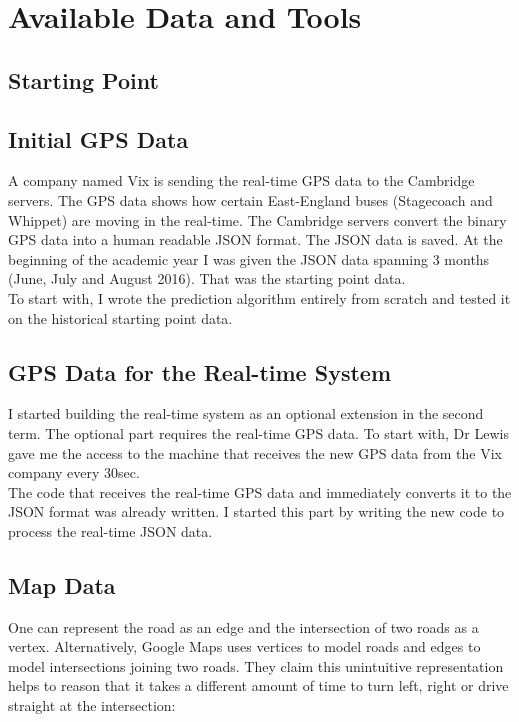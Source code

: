\documentclass[12pt,a4paper,oneside,openright]{report}
\begin{document}
\section{Available Data and Tools}

\subsection{Starting Point}

\subsection*{Initial GPS Data}
A company named Vix is sending the real-time GPS data to the Cambridge servers. The GPS
data shows how certain East-England buses (Stagecoach and Whippet) are moving 
in the real-time. The Cambridge servers convert the binary GPS data into a human readable
JSON format. The JSON data is saved. At the beginning of the academic year I was given the
JSON data spanning 3 months (June, July and August 2016).
That was the starting point data. \\

To start with, I wrote the prediction algorithm entirely from scratch and tested it on the historical
starting point data.

\subsection*{GPS Data for the Real-time System}
I started building the real-time system as an optional extension in the second term.
The optional part requires the real-time GPS data. To start with, Dr Lewis gave me
the access to the machine that receives the new GPS data from the Vix company every 30sec. \\

The code that receives the real-time GPS data and immediately converts it to the JSON format
was already written. I started this part by writing the new code to process the real-time JSON data.

\subsection{Map Data}

One can represent the road as an edge and the intersection of two roads as a vertex.
Alternatively, Google Maps uses vertices to model roads and edges to model intersections
joining two roads. They claim this unintuitive representation helps to reason that
it takes a different amount of time to turn left, right or drive straight at the intersection: \\
\end{document}
